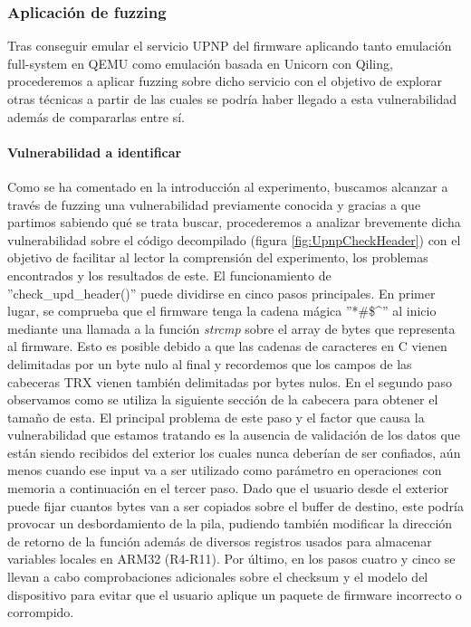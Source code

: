 \subsubsection{Aplicación de fuzzing}
Tras conseguir emular el servicio UPNP del firmware aplicando tanto emulación full-system en QEMU como emulación basada en Unicorn\cite{unicorn}
con Qiling\cite{qiling}, procederemos a aplicar fuzzing sobre dicho servicio con el objetivo de explorar otras técnicas a partir de las cuales 
se podría haber llegado a esta vulnerabilidad además de compararlas entre sí.

\paragraph{Vulnerabilidad a identificar} Como se ha comentado en la introducción al experimento, buscamos alcanzar a través de fuzzing una 
vulnerabilidad previamente conocida y gracias a que partimos sabiendo qué se trata buscar, procederemos a analizar brevemente dicha vulnerabilidad
sobre el código decompilado (figura \ref{fig:UpnpCheckHeader}) con el objetivo de facilitar al lector la comprensión del experimento, los problemas encontrados y los resultados de este. 
El funcionamiento de ''check\_upd\_header()'' puede dividirse en cinco pasos principales. En primer lugar, se comprueba que el firmware tenga 
la cadena mágica ''*\#\$\textasciicircum'' al inicio mediante una llamada a la función \textit{strcmp} sobre el array de bytes que representa al 
firmware. Esto es posible debido a que las cadenas de caracteres en C vienen delimitadas por un byte nulo al final y recordemos que los campos de 
las cabeceras TRX\cite{firmwareFormat} vienen también delimitadas por bytes nulos. En el segundo paso observamos como se utiliza la siguiente 
sección de la cabecera para obtener el tamaño de esta. El principal problema de este paso y el factor que causa la vulnerabilidad que estamos tratando
es la ausencia de validación de los datos que están siendo recibidos del exterior los cuales nunca deberían de ser confiados, aún menos cuando 
ese input va a ser utilizado como parámetro en operaciones con memoria a continuación en el tercer paso. Dado que el usuario desde el exterior
puede fijar cuantos bytes van a ser copiados sobre el buffer de destino, este podría provocar un desbordamiento de la pila, pudiendo también modificar la 
dirección de retorno de la función además de diversos registros usados para almacenar variables locales en ARM32 (R4-R11). Por último, en los pasos 
cuatro y cinco se llevan a cabo comprobaciones adicionales sobre el checksum y el modelo del dispositivo para evitar que el usuario aplique un paquete
de firmware incorrecto o corrompido.

